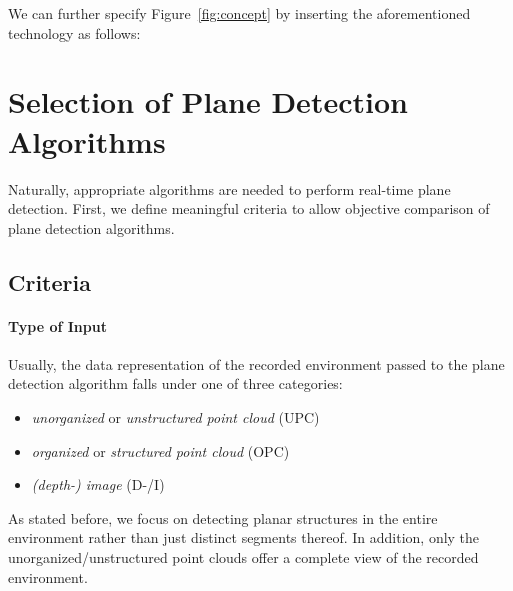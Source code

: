 \documentclass[main.tex]{subfiles}
\begin{document}
We can further specify Figure~\ref{fig:concept} by inserting the aforementioned technology as follows:


\section{Selection of Plane Detection Algorithms}\label{sec:pdaselection}
Naturally, appropriate algorithms are needed to perform real-time plane detection. First, we define meaningful criteria to 
allow objective comparison of plane detection algorithms.  

\subsection{Criteria}

\paragraph{Type of Input}\label{par:input}
Usually, the data representation of the recorded environment passed to the plane detection algorithm falls under one of three categories:
\begin{itemize}
    \item \textit{unorganized} or \textit{unstructured point cloud} (UPC)
    \item \textit{organized} or \textit{structured point cloud} (OPC)
    \item \textit{(depth-) image} (D-/I)
\end{itemize}

As stated before, we focus on detecting planar structures in the entire environment rather than just distinct segments thereof.
In addition, only the unorganized/unstructured point clouds offer a complete view of the recorded environment.


\end{document}
